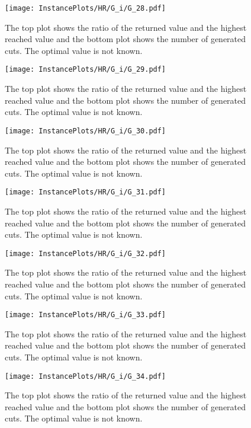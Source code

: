 \documentclass[10pt,a4paper]{article}
\begin{document}
\begin{figure}[H]
\texttt{[image: InstancePlots/HR/G\_i/G\_28.pdf]}
\caption{The top plot shows the ratio of the returned value and the highest reached value     and the bottom plot shows the number of generated cuts. The optimal value is not known.}
\end{figure}

\begin{figure}[H]
\texttt{[image: InstancePlots/HR/G\_i/G\_29.pdf]}
\caption{The top plot shows the ratio of the returned value and the highest reached value     and the bottom plot shows the number of generated cuts. The optimal value is not known.}
\end{figure}

\begin{figure}[H]
\texttt{[image: InstancePlots/HR/G\_i/G\_30.pdf]}
\caption{The top plot shows the ratio of the returned value and the highest reached value     and the bottom plot shows the number of generated cuts. The optimal value is not known.}
\end{figure}

\begin{figure}[H]
\texttt{[image: InstancePlots/HR/G\_i/G\_31.pdf]}
\caption{The top plot shows the ratio of the returned value and the highest reached value     and the bottom plot shows the number of generated cuts. The optimal value is not known.}
\end{figure}

\begin{figure}[H]
\texttt{[image: InstancePlots/HR/G\_i/G\_32.pdf]}
\caption{The top plot shows the ratio of the returned value and the highest reached value     and the bottom plot shows the number of generated cuts. The optimal value is not known.}
\end{figure}

\begin{figure}[H]
\texttt{[image: InstancePlots/HR/G\_i/G\_33.pdf]}
\caption{The top plot shows the ratio of the returned value and the highest reached value     and the bottom plot shows the number of generated cuts. The optimal value is not known.}
\end{figure}

\begin{figure}[H]
\texttt{[image: InstancePlots/HR/G\_i/G\_34.pdf]}
\caption{The top plot shows the ratio of the returned value and the highest reached value     and the bottom plot shows the number of generated cuts. The optimal value is not known.}
\end{figure}
\end{document}
